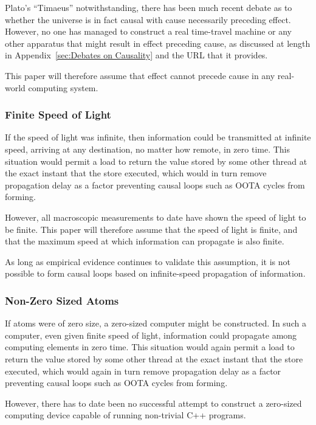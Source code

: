 \documentclass[10]{article}
\begin{document}
Plato's ``Timaeus'' notwithstanding, there has been much recent debate
as to whether the universe is in fact causal with cause necessarily
preceding effect.
However, no one has managed to construct a real time-travel machine
or any other apparatus that might result in effect preceding cause,
as discussed at length in Appendix~\ref{sec:Debates on Causality} and 
the URL that it provides.

This paper will therefore assume that effect cannot precede cause in
any real-world computing system.

\subsubsection{Finite Speed of Light}
\label{sec:Finite Speed of Light}

If the speed of light was infinite, then information could be transmitted
at infinite speed, arriving at any destination, no matter how remote,
in zero time.
This situation would permit a load to return the value stored by some
other thread at the exact instant that the store executed, which
would in turn remove propagation delay as a factor preventing
causal loops such as OOTA cycles from forming.

However, all macroscopic measurements to date have shown the speed of
light to be finite.
This paper will therefore assume that the speed of light is finite, and
that the maximum speed at which information can propagate is also finite.

As long as empirical evidence continues to validate this assumption, it
is not possible to form causal loops based on infinite-speed propagation
of information.

\subsubsection{Non-Zero Sized Atoms}
\label{sec:Non-Zero Sized Atoms}

If atoms were of zero size, a zero-sized computer might be constructed.
In such a computer, even given finite speed of light, information could
propagate among computing elements in zero time.
This situation would again permit a load to return the value stored by
some other thread at the exact instant that the store executed, which
would again in turn remove propagation delay as a factor preventing
causal loops such as OOTA cycles from forming.

However, there has to date been no successful attempt to construct a
zero-sized computing device capable of running non-trivial C++ programs.
\end{document}
